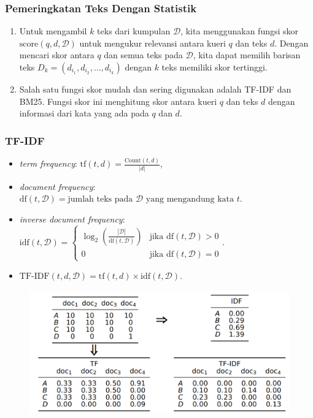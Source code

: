 \documentclass{beamer}
\newcommand{\f}[1]{\textit{#1}}
\begin{document}
\begin{frame}
    \frametitle{{Pemeringkatan Teks Dengan Statistik}}

    \begin{enumerate}
        \item Untuk mengambil $k$ teks dari kumpulan $\mathcal{D}$, kita menggunakan fungsi skor $\text{score}(q, d, \mathcal{D})$ untuk mengukur relevansi antara kueri $q$ dan teks $d$. Dengan mencari skor antara $q$ dan semua teks pada $\mathcal{D}$, kita dapat memilih barisan teks $D_k = (d_{i_1}, d_{i_2},\dots, d_{i_k})$ dengan $k$ teks memiliki skor tertinggi.
        \item Salah satu fungsi skor mudah dan sering digunakan adalah TF-IDF dan BM25. Fungsi skor ini menghitung skor antara kueri $q$ dan teks $d$ dengan informasi dari kata yang ada pada $q$ dan $d$.
    \end{enumerate}
\end{frame}

\begin{frame}
    \frametitle{TF-IDF}
    \begin{itemize}
        \item \f{term frequency}: $\text{tf}(t, d) = \frac{\text{Count}(t, d)}{|d|}$,
        \item \f {document frequency}: $\text{df}(t, \mathcal{D}) = \text{jumlah teks pada } \mathcal{D} \text{ yang mengandung kata } t$. 
        \item \f{inverse document frequency}: $\text{idf}(t, \mathcal{D}) = \begin{cases}
            \log_2\left(\frac{|\mathcal{D}|}{\text{df}(t, \mathcal{D})}\right) & \text{jika } \text{df}(t, \mathcal{D}) > 0 \\
            0 & \text{jika } \text{df}(t, \mathcal{D}) = 0
        \end{cases}$.
        \item $\text{TF-IDF}(t, d, \mathcal{D}) = \text{tf}(t, d) \times \text{idf}(t, \mathcal{D})$.
    \end{itemize}

    \begin{figure}[!ht]
        \centering
        \includegraphics[width=1\textwidth]{assets/pics/tf-idf-matriks.png}
    \end{figure}
\end{frame}
\end{document}
